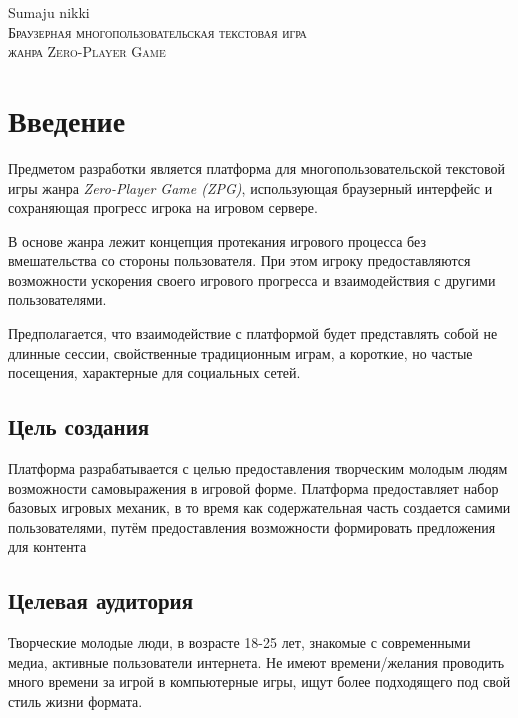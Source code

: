\documentclass[12pt, a4paper]{article}
\begin{document}


\begin{center}
{\namefont\huge Sumaju nikki}\\[6mm]
\textsc{Браузерная многопользовательская текстовая игра\\
жанра Zero-Player Game}
\vspace{4mm}
\end{center}
\tableofcontents
\newpage


\section{Введение}

Предметом разработки является платформа для многопользовательской текстовой игры
жанра \textit{Zero-Player Game (ZPG)}, использующая браузерный интерфейс и
сохраняющая прогресс игрока на игровом сервере.

В основе жанра лежит концепция протекания игрового процесса
без вмешательства со стороны пользователя. При этом игроку предоставляются
возможности ускорения своего игрового прогресса и
взаимодействия с другими пользователями.

Предполагается, что взаимодействие с платформой будет представлять собой
не длинные сессии, свойственные традиционным играм, а короткие, но частые
посещения, характерные для социальных сетей.

\subsection{Цель создания}

Платформа разрабатывается с целью предоставления творческим молодым людям
возможности самовыражения в игровой форме. Платформа предоставляет набор
базовых игровых механик, в то время как содержательная часть создается
самими пользователями, путём предоставления возможности формировать
предложения для контента

\subsection{Целевая аудитория}

Творческие молодые люди, в возрасте 18-25 лет, знакомые с современными медиа,
активные пользователи интернета. Не имеют времени/желания проводить много
времени за игрой в компьютерные игры, ищут более подходящего под свой стиль
жизни формата.
\end{document}
